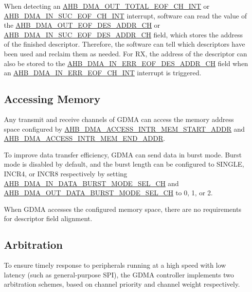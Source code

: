 \documentclass[main\_\_EN.tex]{subfiles}
\begin{document}
When detecting an \hyperref[int: GDMAOUTTOTALEOFINT]{AHB\_DMA\_OUT\_TOTAL\_EOF\_CH\_INT} or \hyperref[int:GDMAINSUCEOFINT]{AHB\_DMA\_IN\_SUC\_EOF\_CH\_INT} interrupt, software can read the value of the \hyperref[fielddesc:AHBDMAOUTEOFDESADDRCHN]{AHB\_DMA\_OUT\_EOF\_DES\_ADDR\_CH} or \hyperref[fielddesc:AHBDMAINSUCEOFDESADDRCHN]{AHB\_DMA\_IN\_SUC\_EOF\_DES\_ADDR\_CH} field, which stores the address of the finished descriptor. Therefore, the software can tell which descriptors have been used and reclaim them as needed. For RX, the address of the descriptor can also be stored to the \hyperref[fielddesc:AHBDMAINERREOFDESADDRCHN]{AHB\_DMA\_IN\_ERR\_EOF\_DES\_ADDR\_CH} field when an  \hyperref[int:GDMAINERREOFINT]{AHB\_DMA\_IN\_ERR\_EOF\_CH\_INT} interrupt is triggered.


\subsection{Accessing Memory}\label{sec:dma-access-inter-ram}

Any transmit and receive channels of GDMA can access the memory address space configured by \hyperref[fielddesc:AHBDMAACCESSINTRMEMSTARTADDR]{AHB\_DMA\_ACCESS\_INTR\_MEM\_START\_ADDR} and \hyperref[fielddesc:AHBDMAACCESSINTRMEMENDADDR]{AHB\_DMA\_ACCESS\_INTR\_MEM\_END\_ADDR}.

To improve data transfer efficiency, GDMA can send data in burst mode. Burst mode is disabled by default, and the burst length can be configured to SINGLE, INCR4, or INCR8 respectively by setting \hyperref[fielddesc:AHBDMAINDATABURSTMODESELCHN]{AHB\_DMA\_IN\_DATA\_BURST\_MODE\_SEL\_CH} and \hyperref[fielddesc:AHBDMAOUTDATABURSTMODESELCHN]{AHB\_DMA\_OUT\_DATA\_BURST\_MODE\_SEL\_CH} to 0, 1, or 2.

When GDMA accesses the configured memory space, there are no requirements for descriptor field alignment.


\subsection{Arbitration}

To ensure timely response to peripherals running at a high speed with low latency (such as general-purpose SPI), the GDMA controller implements two arbitration schemes, based on channel priority and channel weight respectively.
\end{document}
